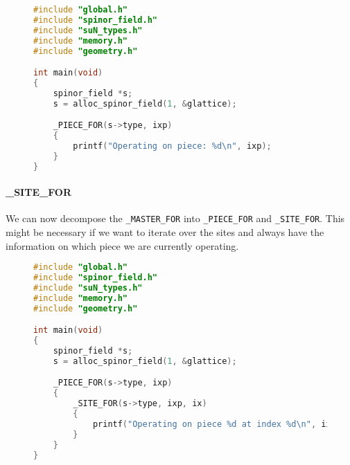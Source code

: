 \documentclass[12pt]{article}
\begin{document}
\begin{figure}[H]
\begin{lstlisting}[caption=\_PIECE\_FOR lets us identify the piece we are operating on,language=C]
#include "global.h"
#include "spinor_field.h"
#include "suN_types.h"
#include "memory.h"
#include "geometry.h"

int main(void)
{
    spinor_field *s;
    s = alloc_spinor_field(1, &glattice);

    _PIECE_FOR(s->type, ixp)
    {
        printf("Operating on piece: %d\n", ixp);
    }
}
\end{lstlisting}
\end{figure}

\paragraph{\_SITE\_FOR} We can now decompose the \texttt{\_MASTER\_FOR} into \texttt{\_PIECE\_FOR} and \texttt{\_SITE\_FOR}. This might be necessary if we want to iterate over the sites and always have the information on which piece we are currently operating.

\begin{figure}[H]
\begin{lstlisting}[caption=Using \_PIECE\_FOR and \_SITE\_FOR to iterate over all sites,language=C]
#include "global.h"
#include "spinor_field.h"
#include "suN_types.h"
#include "memory.h"
#include "geometry.h"

int main(void)
{
    spinor_field *s;
    s = alloc_spinor_field(1, &glattice);

    _PIECE_FOR(s->type, ixp)
    {
        _SITE_FOR(s->type, ixp, ix)
        {
            printf("Operating on piece %d at index %d\n", ixp, ix);
        }
    }
}
\end{lstlisting}
\end{figure}
\end{document}
